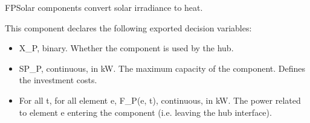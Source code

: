 \documentclass[letterpaper,10pt,english]{sphinxmanual}
\begin{document}
\begin{fulllineitems}
\label{\detokenize{generated/tamos.production.FPSolar:tamos.production.FPSolar}}
\pysigstartsignatures
{}
\pysigstopsignatures{}

\begin{fulllineitems}
\label{\detokenize{generated/tamos.production.FPSolar:tamos.production.FPSolar.__init__}}
\pysigstartsignatures
{}
\pysigstopsignatures
\sphinxAtStartPar
FPSolar components convert solar irradiance to heat.

\sphinxAtStartPar
This component declares the following exported decision variables:
\begin{itemize}
\item {} 
\sphinxAtStartPar
X\_P, binary.
Whether the component is used by the hub.

\item {} 
\sphinxAtStartPar
SP\_P, continuous, in kW.
The maximum capacity of the component. Defines the investment costs.

\item {} 
\sphinxAtStartPar
For all t, for all element e, F\_P(e, t), continuous, in kW.
The power related to element e entering the component (i.e. leaving the hub interface).


\end{itemize}
\end{fulllineitems}
\end{fulllineitems}
\end{document}
